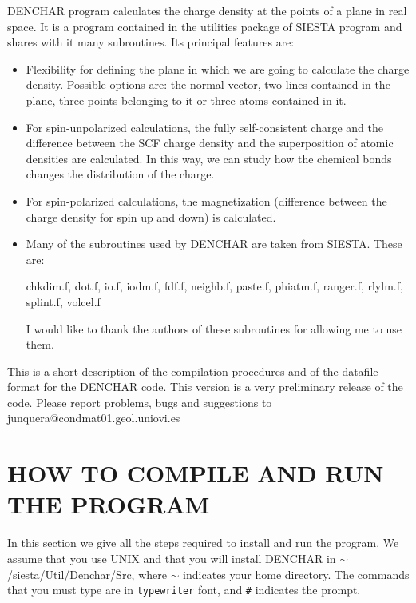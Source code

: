 DENCHAR program calculates the charge density at the points of a plane
in real space. It is a program contained in the utilities package of
SIESTA program and shares with it many subroutines. Its principal 
features are:

\begin{itemize}

\item
Flexibility for defining the plane in which we are going to calculate
the charge density. Possible options are: the normal vector, 
two lines contained in the plane,
three points belonging to it or three atoms contained in it.

\item
For spin-unpolarized calculations, the fully self-consistent charge and
the difference between the SCF charge density and the superposition of atomic
densities are calculated. In this way, we can study how the chemical bonds 
changes the distribution of the charge.
 
\item
For spin-polarized calculations, the magnetization (difference between
the charge density for spin up and down) is calculated.

\item 
Many of the subroutines used by DENCHAR are taken from SIESTA. These are:

chkdim.f, dot.f, io.f, iodm.f, fdf.f, neighb.f, paste.f, phiatm.f, ranger.f,
rlylm.f, splint.f, volcel.f

I would like to thank the authors of these subroutines for allowing me 
to use them.

\end{itemize}

This is a short description of the compilation procedures
and of the datafile format for the DENCHAR code.
This version is a very preliminary release of the code.
Please report problems, bugs and suggestions to
junquera@condmat01.geol.uniovi.es

\section{HOW TO COMPILE AND RUN THE PROGRAM}

\noindent
In this section we give all the steps required to install
and run the program. 
We assume that you use UNIX and that you will install DENCHAR in 
$\sim$/siesta/Util/Denchar/Src, where $\sim$ indicates your home directory.
The commands that you must type are in {\tt typewriter} font, 
and {\tt \#} indicates the prompt.

